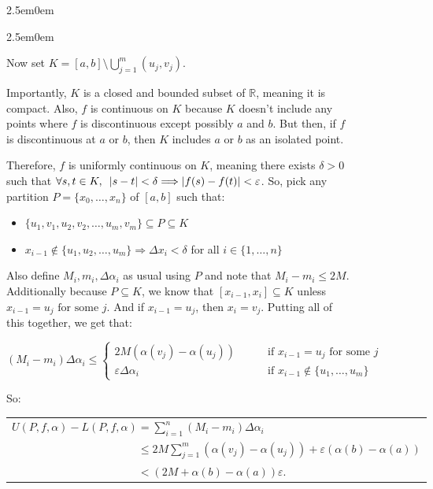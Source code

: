 \documentclass{book}
\newenvironment{myIndent}{%
   \begin{adjustwidth}{2.5em}{0em}%
}{%
   \end{adjustwidth}%
}
\newcommand{\myHS}{ \hspace{0.5em}}
\newcommand{\retTwo}{\hfill\bigbreak}
\begin{document}
{\begin{myIndent}
{\begin{myIndent}
      Now set $K = [a, b] \setminus \bigcup\limits_{j=1}^m(u_j, v_j)$.
      
      \retTwo

      Importantly, $K$ is a closed and bounded subset of $\mathbb{R}$, meaning it is\\ compact. Also, $f$ is continuous on $K$ because $K$ doesn't include any\\ points where $f$ is discontinuous except possibly $a$ and $b$. But then, if $f$\\ is discontinuous at $a$ or $b$, then $K$ includes $a$ or $b$ as an isolated point.\retTwo

      Therefore, $f$ is uniformly continuous on $K$, meaning there exists $\delta > 0$\\ such that $\forall s, t \in K, \myHS |s-t|<\delta \Longrightarrow |f(s) - f(t)| < \varepsilon$. So, pick any\\ partition $P = \{x_0, \ldots, x_n\}$ of $[a, b]$ such that:
      \begin{itemize}
         \item $\{u_1, v_1, u_2, v_2, \ldots, u_m, v_m\} \subseteq P \subseteq K$
         \item $x_{i-1} \notin \{u_1, u_2, \ldots, u_m\} \Longrightarrow \Delta x_i < \delta$ for all $i \in \{1, \ldots, n\}$\retTwo
      \end{itemize}

      Also define $M_i, m_i, \Delta \alpha_i$ as usual using $P$ and note that $M_i - m_i \leq 2M$.\\ Additionally because $P \subseteq K$, we know that $[x_{i-1}, x_{i}] \subseteq K$ unless\\ $x_{i-1} = u_j \text{ for some } j$. And if $x_{i-1} = u_j$, then $x_i = v_j$. Putting all of\\ this together, we get that:\\ [-8pt]

      {\center $(M_i - m_i)\Delta \alpha_i \leq \left\{ 
      \begin{matrix}
         2M(\alpha(v_j) - \alpha(u_j)) & \quad & \text{ if } x_{i-1} = u_j \text{ for some } j\\
         \varepsilon \Delta \alpha_i & \quad & \text{ if } x_{i-1} \notin \{u_1, \ldots, u_m\}
      \end{matrix} \right.$ \par}

      \newpage

      So:\\
      \begin{tabular}{l}
         $U(P, f, \alpha) - L(P, f, \alpha) = \sum\limits_{i=1}^n(M_i - m_i)\Delta \alpha_i$ \\ [4pt]
         $\phantom{U(P, f, \alpha) - L(P, f, \alpha)} \leq 2M \sum\limits_{j=1}^m\left(\alpha(v_j) - \alpha(u_j)\right) + \varepsilon(\alpha(b) - \alpha(a))$ \\ [7pt]
         $\phantom{U(P, f, \alpha) - L(P, f, \alpha)} < (2M + \alpha(b) - \alpha(a))\varepsilon$.\retTwo
      \end{tabular}


\end{myIndent}}
\end{myIndent}}
\end{document}
